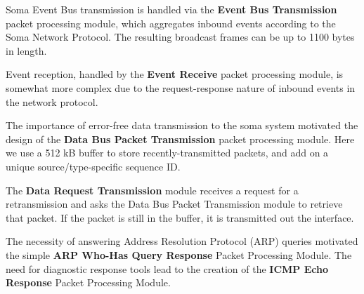 Soma Event Bus transmission is handled via the \textbf{Event Bus
  Transmission} packet processing module, which aggregates inbound
events according to the Soma Network Protocol. The resulting broadcast
frames can be up to 1100 bytes in length.

Event reception, handled by the \textbf{Event Receive} packet
processing module, is somewhat more complex due to the
request-response nature of inbound events in the network protocol.

The importance of error-free data transmission to the soma system
motivated the design of the \textbf{Data Bus Packet Transmission}
packet processing module. Here we use a 512 kB buffer to store
recently-transmitted packets, and add on a unique source/type-specific
sequence ID.

The \textbf{Data Request Transmission} module receives a request for a
retransmission and asks the Data Bus Packet Transmission module to
retrieve that packet. If the packet is still in the buffer, it is
transmitted out the interface.

The necessity of answering Address Resolution Protocol (ARP) queries motivated the simple \textbf{ARP Who-Has Query Response } Packet Processing Module. The need for diagnostic response tools lead to the creation of the \textbf{ICMP Echo Response} Packet Processing Module. 


